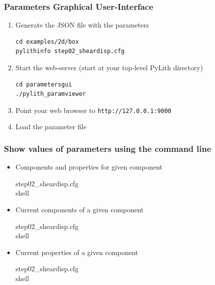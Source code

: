 \documentclass[aspectratio=169]{beamer}
\begin{document}
\begin{frame}[fragile]
  \frametitle{Parameters Graphical User-Interface}

\begin{enumerate}
\item Generate the JSON file with the parameters
\begin{lstlisting}
cd examples/2d/box
pylithinfo step02_sheardisp.cfg
\end{lstlisting}
\item Start the web-server (start at your top-level PyLith directory)
\begin{lstlisting}
cd parametersgui
./pylith_paramviewer
\end{lstlisting}
\item Point your web browser to {\tt http://127.0.0.1:9000}
\item Load the parameter file
\end{enumerate}

\end{frame}


\begin{frame}
  \frametitle{Show values of parameters using the command line}

  \begin{itemize}
  \item Components and properties for given component 
    \begin{description}
    \item[step02\_sheardisp.cfg] 
    \item[shell] 
    \end{description}
  \item Current components of a given component 
    \begin{description}
    \item[step02\_sheardisp.cfg] 
    \item[shell] 
    \end{description}
  \item Current properties of a given component 
    \begin{description}
    \item[step02\_sheardisp.cfg] 
    \item[shell] 
    \end{description}
  \end{itemize}

\end{frame}
\end{document}

